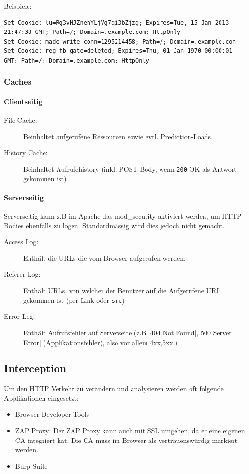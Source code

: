 Beispiele:

\begin{lstlisting}
Set-Cookie: lu=Rg3vHJZnehYLjVg7qi3bZjzg; Expires=Tue, 15 Jan 2013 21:47:38 GMT; Path=/; Domain=.example.com; HttpOnly
Set-Cookie: made_write_conn=1295214458; Path=/; Domain=.example.com
Set-Cookie: reg_fb_gate=deleted; Expires=Thu, 01 Jan 1970 00:00:01 GMT; Path=/; Domain=.example.com; HttpOnly
\end{lstlisting}

\subsubsection{Caches}
\paragraph{Clientseitig}
\begin{description}
	\item[File Cache:] Beinhaltet aufgerufene Ressourcen sowie evtl. Prediction-Loads.
	\item[History Cache:] Beinhaltet Aufrufehistory (inkl. POST Body, wenn \lstinline|200| OK als Antwort gekommen ist)
\end{description}

\paragraph{Serverseitig}
Serverseitig kann z.B im Apache das mod\_security aktiviert werden, um HTTP Bodies ebenfalls zu logen. Standardmässig wird dies jedoch nicht gemacht.
\begin{description}
	\item[Access Log:] Enthält die URLs die vom Browser aufgerufen werden.
	\item[Referer Log:] Enthält URLs, von welcher der Benutzer auf die Aufgerufene URL gekommen ist (per Link oder \lstinline|src|)
	\item[Error Log:] Enthält Aufrufsfehler auf Serverseite (z.B. \lstinline||404 Not Found|, \lstinline||500 Server Error| (Applikationsfehler), also vor allem 4xx,5xx.)
\end{description}

\subsection{Interception}
Um den HTTP Verkehr zu verändern und analysieren werden oft folgende Applikationen eingesetzt:
\begin{itemize}
	\item Browser Developer Tools
	\item ZAP Proxy: Der ZAP Proxy kann auch mit SSL umgehen, da er eine eigenen CA integriert hat. Die CA muss im Browser als vertrauenswürdig markiert werden.
	\item Burp Suite
\end{itemize}

